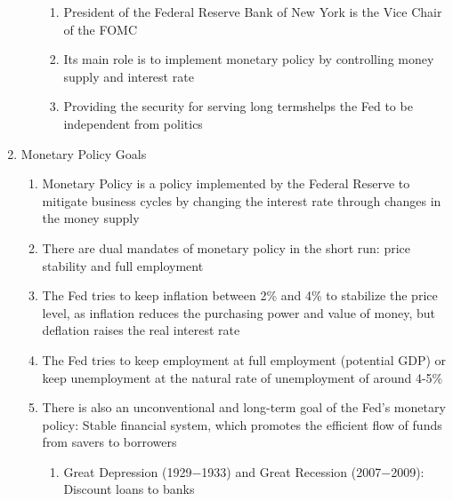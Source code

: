 \documentclass[12pt]{article}
\begin{document}
\begin{enumerate}
\begin{enumerate}
\begin{enumerate}
              \item President of the Federal Reserve Bank of New York is the Vice Chair of the FOMC

              \item Its main role is to implement monetary policy by controlling money supply and interest rate

              \item Providing the security for serving long termshelps the Fed to be independent from politics
                
            \end{enumerate}

        \end{enumerate}

      \item Monetary Policy Goals

        \begin{enumerate}

          \item Monetary Policy is a policy implemented by the Federal Reserve to mitigate business cycles by changing the interest rate through changes in the money supply

          \item There are dual mandates of monetary policy in the short run: price stability and full employment

          \item The Fed tries to keep inflation between 2\% and 4\% to stabilize the price level, as inflation reduces the purchasing power and value of money, but deflation raises the real interest rate

          \item The Fed tries to keep employment at full employment (potential GDP) or keep unemployment at the natural rate of unemployment of around 4-5\%

          \item There is also an unconventional and long-term goal of the Fed's monetary policy: Stable financial system, which promotes the efficient flow of funds from savers to borrowers

            \begin{enumerate}

              \item Great Depression (1929$-$1933) and Great Recession (2007$-$2009): Discount loans to banks

            \end{enumerate}


\end{enumerate}
\end{enumerate}
\end{document}
